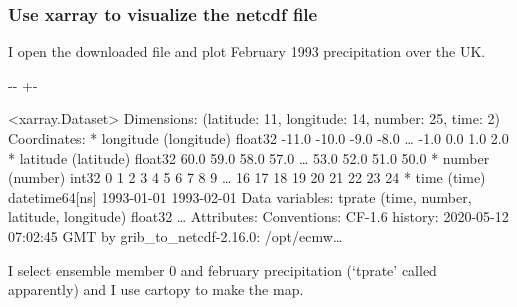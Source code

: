 \documentclass[letterpaper,10pt,english]{sphinxmanual}
\newlength\nbsphinxcodecellspacing
\begin{document}
\subsubsection{Use xarray to visualize the netcdf file}
\label{\detokenize{Notebooks/1.Download/1.Retrieve:Use-xarray-to-visualize-the-netcdf-file}}
I open the downloaded file and plot February 1993 precipitation over the UK.

{
\begin{sphinxVerbatim}[commandchars=\\\{\}]
\llap{\color{nbsphinxin}[5]:\,\hspace{\fboxrule}\hspace{\fboxsep}}

\end{sphinxVerbatim}
}

{

\kern-\sphinxverbatimsmallskipamount\kern-\baselineskip
\kern+\FrameHeightAdjust\kern-\fboxrule
\vspace{\nbsphinxcodecellspacing}

\begin{sphinxVerbatim}[commandchars=\\\{\}]
\llap{\color{nbsphinxout}[5]:\,\hspace{\fboxrule}\hspace{\fboxsep}}<xarray.Dataset>
Dimensions:    (latitude: 11, longitude: 14, number: 25, time: 2)
Coordinates:
  * longitude  (longitude) float32 -11.0 -10.0 -9.0 -8.0 {\ldots} -1.0 0.0 1.0 2.0
  * latitude   (latitude) float32 60.0 59.0 58.0 57.0 {\ldots} 53.0 52.0 51.0 50.0
  * number     (number) int32 0 1 2 3 4 5 6 7 8 9 {\ldots} 16 17 18 19 20 21 22 23 24
  * time       (time) datetime64[ns] 1993-01-01 1993-02-01
Data variables:
    tprate     (time, number, latitude, longitude) float32 {\ldots}
Attributes:
    Conventions:  CF-1.6
    history:      2020-05-12 07:02:45 GMT by grib\_to\_netcdf-2.16.0: /opt/ecmw{\ldots}
\end{sphinxVerbatim}
}

I select ensemble member 0 and february precipitation (‘tprate’ called apparently) and I use cartopy to make the map.
\end{document}
